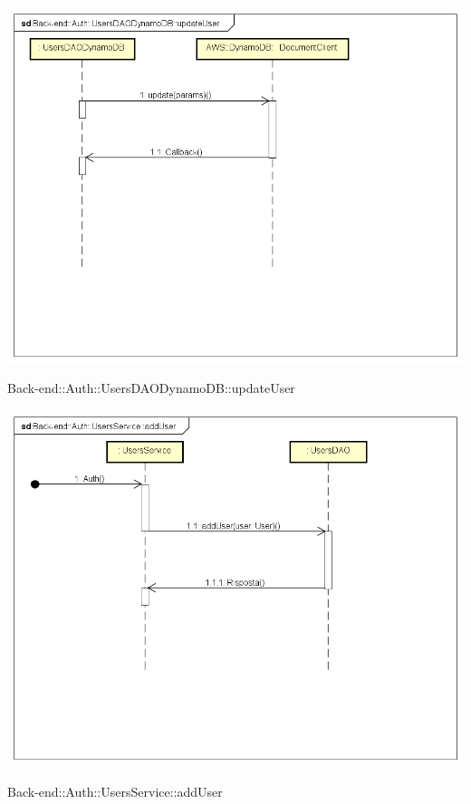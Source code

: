\includegraphics[width=\textwidth,height=\textheight,keepaspectratio]{images/diagrams/back-end/Ufficial_Backend/Back-end__Auth__UsersDAODynamoDB__updateUser.png} 	\caption{Back-end::Auth::UsersDAODynamoDB::updateUser}
\includegraphics[width=\textwidth,height=\textheight,keepaspectratio]{images/diagrams/back-end/Ufficial_Backend/Back-end__Auth__UsersService__addUser.png} 	\caption{Back-end::Auth::UsersService::addUser}
